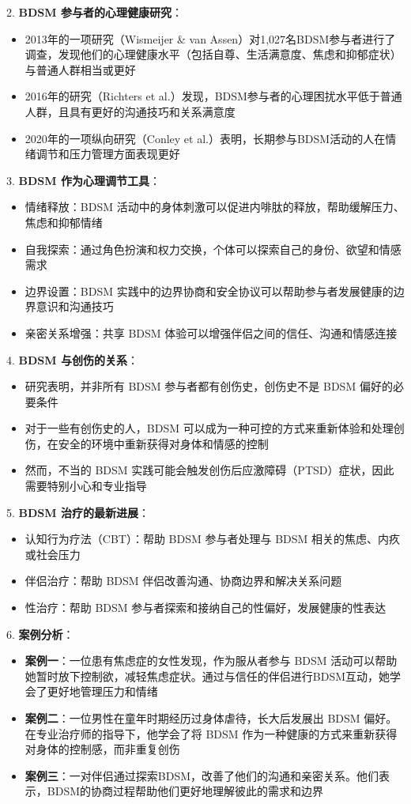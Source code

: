 \documentclass[12pt,UTF8]{ctexbook}
\begin{document}
2. \textbf{BDSM 参与者的心理健康研究}：
  \begin{itemize}
  \item 2013年的一项研究（Wismeijer \& van Assen）对1,027名BDSM参与者进行了调查，发现他们的心理健康水平（包括自尊、生活满意度、焦虑和抑郁症状）与普通人群相当或更好
  \item 2016年的研究（Richters et al.）发现，BDSM参与者的心理困扰水平低于普通人群，且具有更好的沟通技巧和关系满意度
  \item 2020年的一项纵向研究（Conley et al.）表明，长期参与BDSM活动的人在情绪调节和压力管理方面表现更好
  \end{itemize}

3. \textbf{BDSM 作为心理调节工具}：
  \begin{itemize}
  \item 情绪释放：BDSM 活动中的身体刺激可以促进内啡肽的释放，帮助缓解压力、焦虑和抑郁情绪
  \item 自我探索：通过角色扮演和权力交换，个体可以探索自己的身份、欲望和情感需求
  \item 边界设置：BDSM 实践中的边界协商和安全协议可以帮助参与者发展健康的边界意识和沟通技巧
  \item 亲密关系增强：共享 BDSM 体验可以增强伴侣之间的信任、沟通和情感连接
  \end{itemize}

4. \textbf{BDSM 与创伤的关系}：
  \begin{itemize}
  \item 研究表明，并非所有 BDSM 参与者都有创伤史，创伤史不是 BDSM 偏好的必要条件
  \item 对于一些有创伤史的人，BDSM 可以成为一种可控的方式来重新体验和处理创伤，在安全的环境中重新获得对身体和情感的控制
  \item 然而，不当的 BDSM 实践可能会触发创伤后应激障碍（PTSD）症状，因此需要特别小心和专业指导
  \end{itemize}

5. \textbf{BDSM 治疗的最新进展}：
  \begin{itemize}
  \item 认知行为疗法（CBT）：帮助 BDSM 参与者处理与 BDSM 相关的焦虑、内疚或社会压力
  \item 伴侣治疗：帮助 BDSM 伴侣改善沟通、协商边界和解决关系问题
  \item 性治疗：帮助 BDSM 参与者探索和接纳自己的性偏好，发展健康的性表达
  \end{itemize}

6. \textbf{案例分析}：
  \begin{itemize}
  \item \textbf{案例一}：一位患有焦虑症的女性发现，作为服从者参与 BDSM 活动可以帮助她暂时放下控制欲，减轻焦虑症状。通过与信任的伴侣进行BDSM互动，她学会了更好地管理压力和情绪
  \item \textbf{案例二}：一位男性在童年时期经历过身体虐待，长大后发展出 BDSM 偏好。在专业治疗师的指导下，他学会了将 BDSM 作为一种健康的方式来重新获得对身体的控制感，而非重复创伤
  \item \textbf{案例三}：一对伴侣通过探索BDSM，改善了他们的沟通和亲密关系。他们表示，BDSM的协商过程帮助他们更好地理解彼此的需求和边界
  \end{itemize}
\end{document}
